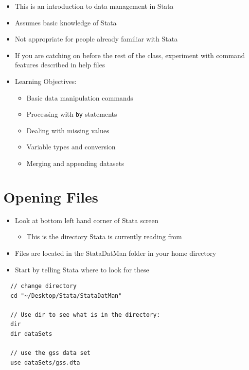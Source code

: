 \documentclass[]{book}
\providecommand{\tightlist}{%
  \setlength{\itemsep}{0pt}\setlength{\parskip}{0pt}}
\begin{document}
\begin{itemize}
\tightlist
\item
  This is an introduction to data management in Stata
\item
  Assumes basic knowledge of Stata
\item
  Not appropriate for people already familiar with Stata
\item
  If you are catching on before the rest of the class, experiment with
  command features described in help files
\item
  Learning Objectives:

  \begin{itemize}
  \tightlist
  \item
    Basic data manipulation commands
  \item
    Processing with \texttt{by} statements
  \item
    Dealing with missing values
  \item
    Variable types and conversion
  \item
    Merging and appending datasets
  \end{itemize}
\end{itemize}

\section{Opening Files}\label{opening-files}

\begin{itemize}
\tightlist
\item
  Look at bottom left hand corner of Stata screen

  \begin{itemize}
  \tightlist
  \item
    This is the directory Stata is currently reading from
  \end{itemize}
\item
  Files are located in the StataDatMan folder in your home directory
\item
  Start by telling Stata where to look for these
\end{itemize}

\begin{verbatim}
  // change directory
  cd "~/Desktop/Stata/StataDatMan"

  // Use dir to see what is in the directory:
  dir
  dir dataSets

  // use the gss data set
  use dataSets/gss.dta
\end{verbatim}
\end{document}
